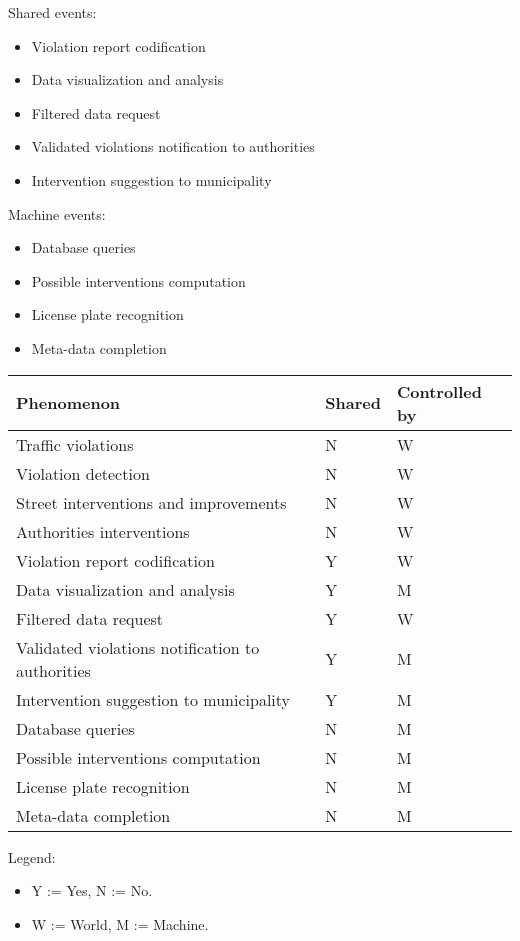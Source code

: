 Shared events:
\begin{itemize}
    \item Violation report codification
    \item Data visualization and analysis
    \item Filtered data request
    \item Validated violations notification to authorities
    \item Intervention suggestion to municipality
\end{itemize}

Machine events:
\begin{itemize}
    \item Database queries
    \item Possible interventions computation
    \item License plate recognition
    \item Meta-data completion
\end{itemize}

\bigskip
\begin{center}
\begin{tabular}{|p{9cm}|l|l|}
	\hline 
	Phenomenon & Shared & Controlled by\\ 
	\hline 
	Traffic violations &  N & W \\ 
	\hline 
	Violation detection &  N & W\\ 
	\hline 
	Street interventions and improvements & N &  W \\ 
	\hline 
	Authorities interventions & N &  W \\
	\hline 
	Violation report codification & Y & W\\ 
	\hline 
	Data visualization and analysis & Y & M\\ 
	\hline
	Filtered data request & Y & W\\
	\hline 
	Validated violations notification to authorities & Y & M\\ 
	\hline 
	Intervention suggestion to municipality & Y & M\\ 
	\hline 
	Database queries & N & M\\ 
	\hline
	Possible interventions computation & N & M\\ 
	\hline
	License plate recognition & N & M\\ 
	\hline
	Meta-data completion & N & M\\ 
	\hline
\end{tabular} 
\end{center}
Legend:
\begin{itemize}
	\item Y := Yes, N := No.
	\item W := World, M := Machine.
\end{itemize}